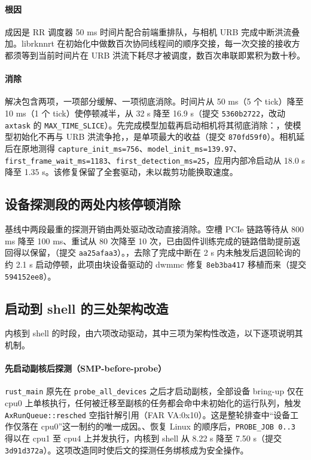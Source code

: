 \paragraph{根因}
成因是 RR 调度器 50 ms 时间片配合前端重排队，与相机 URB 完成中断洪流叠加。librknnrt 在初始化中做数百次协同线程间的顺序交接，每一次交接的接收方都须等到当前时间片在 URB 洪流下耗尽才被调度，数百次串联即累积为数十秒。

\paragraph{消除}
解决包含两项，一项部分缓解、一项彻底消除。时间片从 50 ms（5 个 tick）降至 10 ms（1 个 tick）使停顿减半，从 32 s 降至 16.9 s（提交 \texttt{5360b2722}，改动 \texttt{axtask} 的 \texttt{MAX\_TIME\_SLICE}）。先完成模型加载再启动相机将其彻底消除：，使模型初始化不再与 URB 洪流争抢，，是单项最大的收益（提交 \texttt{870fd59f0}）。相机延后在原地测得 \texttt{capture\_init\_ms=756}、\texttt{model\_init\_ms=139.97}、\texttt{first\_frame\_wait\_ms=1183}、\texttt{first\_detection\_ms=25}，应用内部冷启动从 18.0 s 降至 1.35 s。该修复保留了全套驱动，未以裁剪功能换取速度。

\subsection{设备探测段的两处内核停顿消除}

基线中两段最重的探测开销由两处驱动改动直接消除。空槽 PCIe 链路等待从 800 ms 降至 100 ms、重试从 80 次降至 10 次，已由固件训练完成的链路借助提前返回得以保留，（提交 \texttt{aa25afaa3}）。，去除了完成中断在 2 s 内未触发后退回轮询的约 2.1 s 启动停顿，此项由块设备驱动的 dwmmc 修复 \texttt{8eb3ba417} 移植而来（提交 \texttt{594152ee8}）。

\subsection{启动到 shell 的三处架构改造}

内核到 shell 的时段，由六项改动驱动，其中三项为架构性改造，以下逐项说明其机制。

\paragraph{先启动副核后探测（SMP-before-probe）}
\texttt{rust\_main} 原先在 \texttt{probe\_all\_devices} 之后才启动副核，全部设备 bring-up 仅在 cpu0 上单核执行，任何被迁移至副核的任务都会命中未初始化的运行队列，触发 \texttt{AxRunQueue::resched} 空指针解引用（FAR VA:0x10）。这是整轮排查中“设备工作仅落在 cpu0”这一制约的唯一成因。、恢复 Linux 的顺序后，\texttt{PROBE\_JOB 0..3} 得以在 cpu1 至 cpu4 上并发执行，内核到 shell 从 8.22 s 降至 7.50 s（提交 \texttt{3d91d372a}）。这项改造同时使后文的探测任务绑核成为安全操作。

